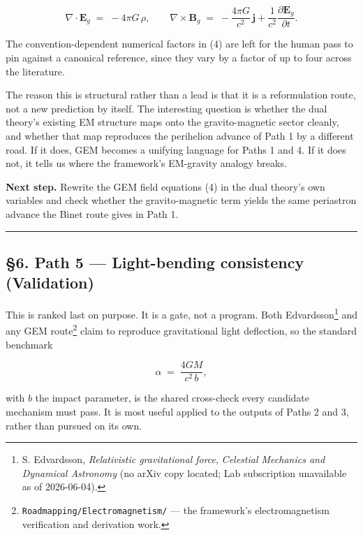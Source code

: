 \documentclass[
  11pt,
]{article}
\begin{document}
\[
\nabla\cdot\mathbf{E}_g \;=\; -4\pi G\,\rho, \qquad
\nabla\times\mathbf{B}_g \;=\; -\frac{4\pi G}{c^{2}}\,\mathbf{j} + \frac{1}{c^{2}}\frac{\partial \mathbf{E}_g}{\partial t}. \tag{4}
\]

The convention-dependent numerical factors in (4) are left for the human
pass to pin against a canonical reference, since they vary by a factor
of up to four across the literature.

The reason this is structural rather than a lead is that it is a
reformulation route, not a new prediction by itself. The interesting
question is whether the dual theory's existing EM structure maps onto
the gravito-magnetic sector cleanly, and whether that map reproduces the
perihelion advance of Path 1 by a different road. If it does, GEM
becomes a unifying language for Paths 1 and 4. If it does not, it tells
us where the framework's EM-gravity analogy breaks.

\textbf{Next step.} Rewrite the GEM field equations (4) in the dual
theory's own variables and check whether the gravito-magnetic term
yields the same periastron advance the Binet route gives in Path 1.

\begin{center}\rule{0.5\linewidth}{0.5pt}\end{center}

\hypertarget{path-5-light-bending-consistency-validation}{%
\subsection{§6. Path 5 --- Light-bending consistency
(Validation)}\label{path-5-light-bending-consistency-validation}}

This is ranked last on purpose. It is a gate, not a program. Both
Edvardsson\footnote{S. Edvardsson, \emph{Relativistic gravitational
  force}, \emph{Celestial Mechanics and Dynamical Astronomy} (no arXiv
  copy located; Lab subscription unavailable as of 2026-06-04).} and any
GEM route\footnote{\texttt{Roadmapping/Electromagnetism/} --- the
  framework's electromagnetism verification and derivation work.} claim
to reproduce gravitational light deflection, so the standard benchmark

\[
\alpha \;=\; \frac{4 G M}{c^{2}\,b}, \tag{5}
\]

with \(b\) the impact parameter, is the shared cross-check every
candidate mechanism must pass. It is most useful applied to the outputs
of Paths 2 and 3, rather than pursued on its own.
\end{document}
